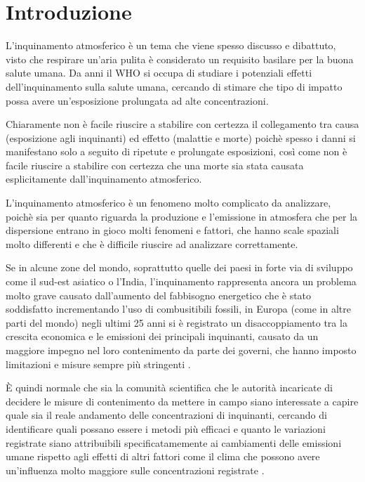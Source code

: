 \documentclass[a4paper]{report}
\begin{document}
\tableofcontents


\chapter{Introduzione}
L'inquinamento atmosferico è un tema che viene spesso discusso e dibattuto, visto che respirare un'aria pulita è considerato un requisito basilare per la buona salute umana. Da anni il WHO \cite{world2006air} si occupa di studiare i potenziali effetti dell'inquinamento sulla salute umana, cercando di stimare che tipo di impatto possa avere un'esposizione prolungata ad alte concentrazioni.  

Chiaramente non è facile riuscire a stabilire con certezza il collegamento tra causa (esposizione agli inquinanti) ed effetto (malattie e morte) poichè spesso i danni si manifestano solo a seguito di ripetute e prolungate esposizioni, così come non è facile riuscire a stabilire con certezza che una morte sia stata causata esplicitamente dall'inquinamento atmosferico.  

L'inquinamento atmosferico è un fenomeno molto complicato da analizzare, poichè sia per quanto riguarda la produzione e l'emissione in atmosfera che per la dispersione entrano in gioco molti fenomeni e fattori, che hanno scale spaziali molto differenti e che è difficile riuscire ad analizzare correttamente.  

Se in alcune zone del mondo, soprattutto quelle dei paesi in forte via di sviluppo come il sud-est asiatico o l'India, l'inquinamento rappresenta ancora un problema molto grave causato dall'aumento del fabbisogno energetico che è stato soddisfatto incrementando l'uso di combusitibili fossili, in Europa (come in altre parti del mondo) negli ultimi 25 anni si è registrato un disaccoppiamento tra la crescita economica e le emissioni dei principali inquinanti, causato da un maggiore impegno nel loro contenimento da parte dei governi, che hanno imposto limitazioni e misure sempre più stringenti \cite{cattani2014analisi}.

È quindi normale che sia la comunità scientifica che le autorità incaricate di decidere le misure di contenimento da mettere in campo siano interessate a capire quale sia il reale andamento delle concentrazioni di inquinanti, cercando di identificare quali possano essere i metodi più efficaci e quanto le variazioni registrate siano attribuibili specificatamemente ai cambiamenti delle emissioni umane rispetto agli effetti di altri fattori come il clima che possono avere un'influenza molto maggiore sulle concentrazioni registrate \cite{porter2001ozone}.  
\end{document}
